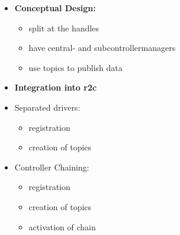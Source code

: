 \begin{itemize}
    \item \textbf{Conceptual Design:}
    \begin{itemize}
        \item split at the handles
        \item have central- and subcontrollermanagers
        \item use topics to publish data
    \end{itemize}
    \item \textbf{Integration into \gls{r2c}}
    \item Separated drivers:
    \begin{itemize}
        \item registration
        \item creation of topics
    \end{itemize}
        \item Controller Chaining:
    \begin{itemize}
        \item registration
        \item creation of topics
        \item activation of chain
    \end{itemize}
\end{itemize}